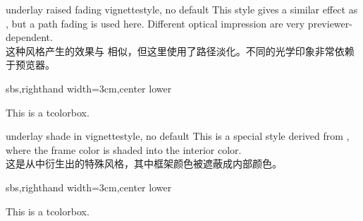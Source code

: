 \begin{docTcbKey}[][doc new=2016-04-22]{underlay raised fading vignette}{}{style, no default}
This style gives a similar effect as ,
but a path fading is used here. Different optical impression are very
previewer-dependent.
\\这种风格产生的效果与  相似，但这里使用了路径淡化。不同的光学印象非常依赖于预览器。
\begin{dispExample*}{sbs,righthand width=3cm,center lower}
\begin{tcolorbox}[enhanced,sharp corners,
colback=green!10,
colframe=green!50!black,
size=small,boxrule=2mm,titlerule=0mm,
title=My title,center title,fonttitle=\bfseries,
underlay raised fading vignette]
This is a tcolorbox.
\end{tcolorbox}
\end{dispExample*}
\end{docTcbKey}

\begin{docTcbKey}[][doc new=2016-04-22]{underlay shade in vignette}{}{style, no default}
This is a special style derived from ,
where the frame color is shaded into the interior color.
\\这是从中衍生出的特殊风格，其中框架颜色被遮蔽成内部颜色。
\begin{dispExample*}{sbs,righthand width=3cm,center lower}
\begin{tcolorbox}[enhanced,sharp corners,frame hidden,
colback=green!10,
colframe=green!50!black,
size=small,boxrule=2mm,titlerule=0mm,
underlay shade in vignette]
This is a tcolorbox.
\end{tcolorbox}
\end{dispExample*}
\end{docTcbKey}

